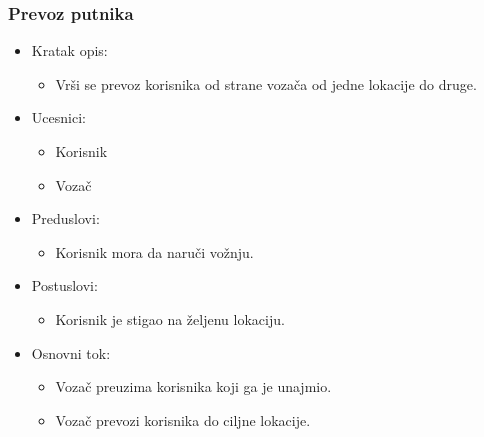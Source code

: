 \subsubsection{\bfseries Prevoz putnika}
\begin{itemize}
	\item Kratak opis:
		\begin{itemize}
			\item Vrši se prevoz korisnika od strane vozača od jedne lokacije do druge.
		\end{itemize}
 
	\item Ucesnici:
		\begin{itemize}
		    \item Korisnik
		    \item Vozač
		\end{itemize}				

	\item Preduslovi:
		\begin{itemize}
		    \item Korisnik mora da naruči vožnju.
		\end{itemize}

	\item Postuslovi:
		\begin{itemize}
			\item Korisnik je stigao na željenu lokaciju.
		\end{itemize}		


	\item Osnovni tok:
		\begin{itemize}
		    \itemKorisnik čeka da vozač stigne na prosleđenu lokaciju.
		    \item Vozač preuzima korisnika koji ga je unajmio.  
		    \item Vozač prevozi korisnika do ciljne lokacije.
		\end{itemize}
\end{itemize}

